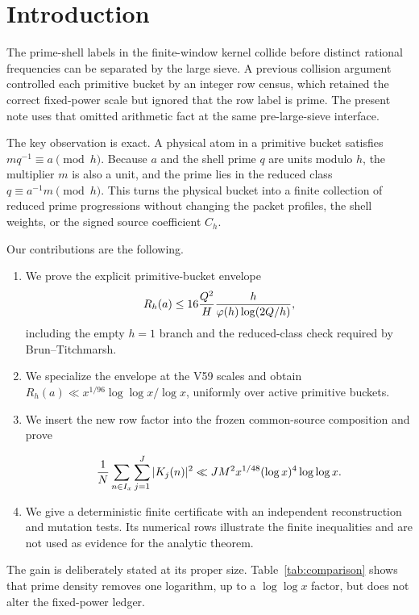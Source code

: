 \section{Introduction}
\label{sec:introduction}

The prime-shell labels in the finite-window kernel collide before distinct
rational frequencies can be separated by the large sieve.  A previous
collision argument controlled each primitive bucket by an integer row census,
which retained the correct fixed-power scale but ignored that the row label is
prime.  The present note uses that omitted arithmetic fact at the same
pre-large-sieve interface.

The key observation is exact.  A physical atom in a primitive bucket satisfies
$mq^{-1}\equiv a\pmod h$.  Because $a$ and the shell prime $q$ are units
modulo $h$, the multiplier $m$ is also a unit, and the prime lies in the
reduced class $q\equiv a^{-1}m\pmod h$.  This turns the physical bucket into
a finite collection of reduced prime progressions without changing the packet
profiles, the shell weights, or the signed source coefficient $C_h$.

Our contributions are the following.

\begin{enumerate}[label=(\roman*),leftmargin=2.2em]
\item We prove the explicit primitive-bucket envelope
\[
 R_h(a)\leq
 16\frac{Q^2}{H}\frac{h}{\varphi(h)\log(2Q/h)},
\]
including the empty $h=1$ branch and the reduced-class check required by
Brun--Titchmarsh.
\item We specialize the envelope at the V59 scales and obtain
$R_h(a)\ll x^{1/96}\log\log x/\log x$, uniformly over active primitive
buckets.
\item We insert the new row factor into the frozen common-source composition
and prove

\[
 \frac1N\sum_{n\in I_x}\sum_{j=1}^{J}|K_j(n)|^2
 \ll JM^2x^{1/48}(\log x)^4\log\log x.
\]
\item We give a deterministic finite certificate with an independent
reconstruction and mutation tests.  Its numerical rows illustrate the finite
inequalities and are not used as evidence for the analytic theorem.
\end{enumerate}

The gain is deliberately stated at its proper size.  Table~\ref{tab:comparison}
shows that prime density removes one logarithm, up to a $\log\log x$ factor,
but does not alter the fixed-power ledger.

